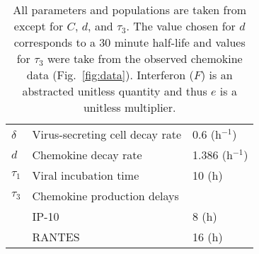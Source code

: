 \documentclass[10pt]{article}
\begin{document}
\begin{table}
\begin{center}
\begin{tabular}{|  l  l  l  |}
  $\delta$ & Virus-secreting cell decay rate & 0.6 (h$^{-1}$) \\
  $d$ & Chemokine decay rate & 1.386 (h$^{-1}$) \\
  $\tau_1$ & Viral incubation time & 10 (h) \\
  $\tau_3$ & Chemokine production delays & \\
    & \hspace{2em} IP-10 & 8 (h)\\
    & \hspace{2em} RANTES & 16 (h)\\
  \hline
\end{tabular}
\caption{All parameters and populations are taken from \cite{Mitchell2011} except for $C$, $d$, and $\tau_3$.  The value chosen for $d$ corresponds to a 30 minute half-life and values for $\tau_3$ were take from the observed chemokine data (Fig.~\ref{fig:data}).  Interferon ($F$) is an abstracted unitless quantity and thus $e$ is a unitless multiplier.}
\label{tab:dde}
\end{center}
\end{table}
\end{document}
